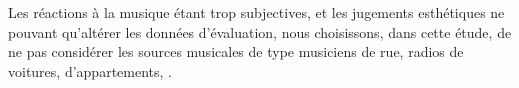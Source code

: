 Les réactions à la musique étant trop subjectives, et les jugements esthétiques ne pouvant qu'altérer les données d'évaluation, nous choisissons, dans cette étude, de ne pas considérer les sources musicales de type musiciens de rue, radios de voitures, d'appartements, \etc. 
 
\begin{figure}[t]
        \myfloatalign
        \par

\end{figure}
